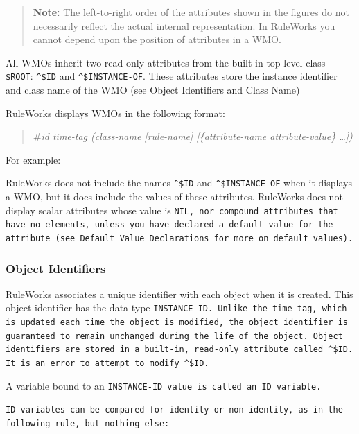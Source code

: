 \begin{quote}
  \textbf{Note:} The left-to-right order of the attributes shown in
  the figures do not necessarily reflect the actual internal
  representation. In RuleWorks you cannot depend upon the position of
  attributes in a WMO.
\end{quote}

All WMOs inherit two read-only attributes from the built-in
top-level class \verb|$ROOT|: \verb|^$ID| and \verb|^$INSTANCE-OF|. These
attributes store the instance identifier and class name of
the WMO (see Object Identifiers and Class Name)

RuleWorks displays WMOs in the following format:
\begin{quote}
\#\it{id} \it{time-tag} (\it{class-name} [\it{rule-name}] [\{\ct\it{attribute-name} \it{attribute-value}\} \ldots])
\end{quote}
For example:

RuleWorks does not include the names \verb|^$ID| and \verb|^$INSTANCE-OF|
when it displays a WMO, but it does include the values of
these attributes. RuleWorks does not display scalar
attributes whose value is \tt{NIL}, nor compound attributes that
have no elements, unless you have declared a default value
for the attribute (see Default Value Declarations for more on
default values).

\subsubsection*{Object Identifiers}

RuleWorks associates a unique identifier with each object
when it is created. This object identifier has the data type
\tt{INSTANCE-ID}. Unlike the time-tag, which is updated each time
the object is modified, the object identifier is guaranteed
to remain unchanged during the life of the object. Object
identifiers are stored in a built-in, read-only attribute
called \verb|^$ID|. It is an error to attempt to modify \verb|^$ID|.

A variable bound to an \tt{INSTANCE-ID} value is called an \tt{ID}
variable.

\tt{ID} variables can be compared for identity or non-identity,
as in the following rule, but nothing else:

